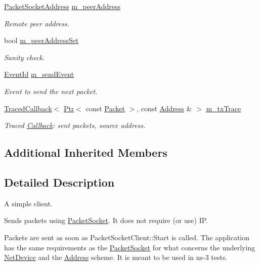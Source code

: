 \begin{DoxyCompactItemize}
\hyperlink{classns3_1_1PacketSocketAddress}{Packet\+Socket\+Address} \hyperlink{classns3_1_1PacketSocketClient_af69b407a03a7a42baa902e622b07f6cf}{m\+\_\+peer\+Address}
\begin{DoxyCompactList}\small\item\em Remote peer address. \end{DoxyCompactList}\item 
bool \hyperlink{classns3_1_1PacketSocketClient_ad6674274402bc6506d8fc5c8b0210f92}{m\+\_\+peer\+Address\+Set}
\begin{DoxyCompactList}\small\item\em Sanity check. \end{DoxyCompactList}\item 
\hyperlink{classns3_1_1EventId}{Event\+Id} \hyperlink{classns3_1_1PacketSocketClient_a6f213865e8780152a1cc67d41be69923}{m\+\_\+send\+Event}
\begin{DoxyCompactList}\small\item\em Event to send the next packet. \end{DoxyCompactList}\item 
\hyperlink{classns3_1_1TracedCallback}{Traced\+Callback}$<$ \hyperlink{classns3_1_1Ptr}{Ptr}$<$ const \hyperlink{classns3_1_1Packet}{Packet} $>$, const \hyperlink{classns3_1_1Address}{Address} \& $>$ \hyperlink{classns3_1_1PacketSocketClient_ad771026f2bfd7c6202be47d0f17f9582}{m\+\_\+tx\+Trace}
\begin{DoxyCompactList}\small\item\em Traced \hyperlink{classns3_1_1Callback}{Callback}\+: sent packets, source address. \end{DoxyCompactList}\end{DoxyCompactItemize}
\subsection*{Additional Inherited Members}


\subsection{Detailed Description}
A simple client. 

Sends packets using \hyperlink{classns3_1_1PacketSocket}{Packet\+Socket}. It does not require (or use) IP.

Packets are sent as soon as Packet\+Socket\+Client\+::\+Start is called. The application has the same requirements as the \hyperlink{classns3_1_1PacketSocket}{Packet\+Socket} for what concerns the underlying \hyperlink{classns3_1_1NetDevice}{Net\+Device} and the \hyperlink{classns3_1_1Address}{Address} scheme. It is meant to be used in ns-\/3 tests.

